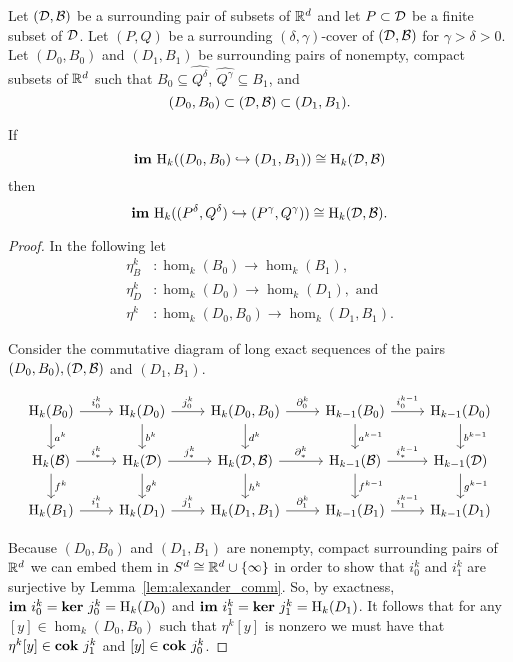 
\begin{theorem}\label{thm:main}
  Let $({\mathcal{D}}, {\mathcal{B}})$ be a surrounding pair of subsets of $\mathbb{R}^d$ and let $P\subset {\mathcal{D}}$ be a finite subset of ${\mathcal{D}}$.
  Let $(P, Q)$ be a surrounding $(\delta,\gamma)$-cover of $({\mathcal{D}}, {\mathcal{B}})$ for $\gamma > \delta > 0$.
  Let $(D_0, B_0)$ and $(D_1, B_1)$ be surrounding pairs of nonempty, compact subsets of $\mathbb{R}^d$ such that $B_0\subseteq \hat{Q^\delta}$, $\hat{Q^\gamma}\subseteq B_1$, and
  \[ (D_0, B_0)\subset ({\mathcal{D}}, {\mathcal{B}}) \subset (D_1, B_1).\]

  If
  \[\mathbf{im}~\mathrm{H}_k((D_0, B_0)\hookrightarrow (D_1, B_1))\cong \mathrm{H}_k({\mathcal{D}}, {\mathcal{B}})\]
  then
  \[\mathbf{im}~\mathrm{H}_k((P^\delta, Q^\delta)\hookrightarrow (P^\gamma, Q^\gamma))\cong \mathrm{H}_k({\mathcal{D}}, {\mathcal{B}}).\]
\end{theorem}
\begin{proof}

  In the following let
  \begin{align*}
    \eta_B^k &: \hom_k(B_0)\to \hom_k(B_1),\\
    \eta_D^k &: \hom_k(D_0)\to \hom_k(D_1),\text{ and }\\
    \eta^k &: \hom_k(D_0, B_0)\to \hom_k(D_1, B_1).
  \end{align*}

  Consider the commutative diagram of long exact sequences of the pairs $(D_0, B_0), ({\mathcal{D}}, {\mathcal{B}})$ and $(D_1, B_1)$.

  \begin{equation}\begin{tikzcd}
      \hom_k(B_0)\arrow{r}{i^k_0}\arrow{d}{a^k} &
      \hom_k(D_0)\arrow{r}{j^k_0} \arrow{d}{b^k} &
      \hom_k(D_0, B_0)\arrow{r}{\partial^k_0}\arrow{d}{d^k} &
      \hom_{k-1}(B_0)\arrow{r}{i^{k-1}_0}\arrow{d}{a^{k-1}} &
      \hom_{k-1}(D_0) \arrow{d}{b^{k-1}}\\
      \hom_k(\B)\arrow{r}{i_*^k}\arrow{d}{f^k} &
      \hom_k(\D)\arrow{r}{j_*^k}\arrow{d}{g^k} &
      \hom_k(\D, \B)\arrow{r}{\partial_*^k}\arrow{d}{h^k} &
      \hom_{k-1}(\B)\arrow{r}{i_*^{k-1}}\arrow{d}{f^{k-1}} &
      \hom_{k-1}(\D)\arrow{d}{g^{k-1}}\\
      \hom_k(B_1)\arrow{r}{i^k_1} &
      \hom_k(D_1)\arrow{r}{j^k_1} &
      \hom_k(D_1, B_1)\arrow{r}{\partial^k_1} &
      \hom_{k-1}(B_1)\arrow{r}{i^{k-1}_1} &
      \hom_{k-1}(D_1)
  \end{tikzcd}\end{equation}

  Because $(D_0, B_0)$ and $(D_1, B_1)$ are nonempty, compact surrounding pairs of $\mathbb{R}^d$ we can embed them in $S^d \cong \mathbb{R}^d\cup\{\infty\}$ in order to show that $i_0^k$ and $i_1^k$ are surjective by Lemma~\ref{lem:alexander_comm}.
  So, by exactness, $\mathbf{im}~i_0^k = \mathbf{ker}~j_0^k = \mathrm{H}_k(D_0)$ and $\mathbf{im}~i_1^k = \mathbf{ker}~j_1^k = \mathrm{H}_k(D_1)$.
  It follows that for any $[y]\in \hom_k(D_0, B_0)$ such that $\eta^k[y]$ is nonzero we must have that $\eta^k[y]\in\mathbf{cok}~j^k_1$ and $[y]\in\mathbf{cok}~j^k_0$.


\end{proof}
